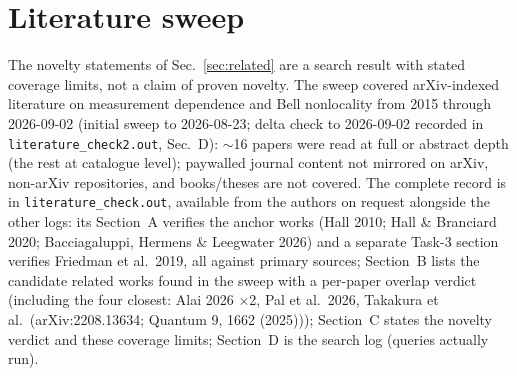 \documentclass[aps,pra,reprint,superscriptaddress,floatfix]{revtex4-2}
\begin{document}
\section{Literature sweep}
\label{supp:sweep}

The novelty statements of Sec.~\ref{sec:related} are a search result with
stated coverage limits, not a claim of proven novelty. The sweep covered
arXiv-indexed literature on measurement dependence and Bell nonlocality from
2015 through 2026-09-02 (initial sweep to 2026-08-23; delta check to
2026-09-02 recorded in \texttt{literature\_check2.out}, Sec.~D): $\sim$16 papers were read at full or abstract depth
(the rest at catalogue level); paywalled journal content not mirrored on
arXiv, non-arXiv repositories, and books/theses are not covered. The complete
record is in \texttt{literature\_check.out}, available from the authors on
request alongside the other logs: its Section~A verifies the anchor works
(Hall 2010; Hall \& Branciard 2020; Bacciagaluppi, Hermens \& Leegwater
2026) and a separate Task-3 section verifies Friedman et al.\ 2019, all
against primary sources; Section~B lists the
candidate related works found in the sweep with a per-paper overlap verdict
(including the four closest: Alai 2026 $\times$2, Pal et al.\ 2026, Takakura
et al.\ (arXiv:2208.13634; Quantum 9, 1662 (2025))); Section~C states the novelty verdict and these coverage
limits; Section~D is the search log (queries actually run).



\end{document}
